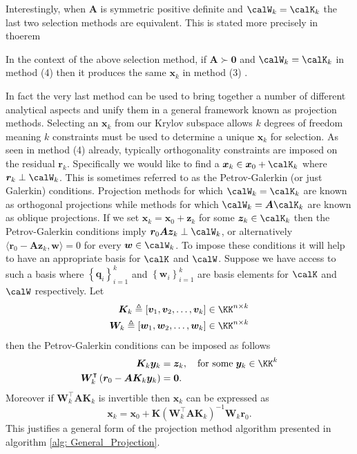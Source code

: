 Interestingly, when $\bm{A}$ is symmetric positive definite and $\calW_k = \calK_k$ the last two selection methods are equivalent. This is stated more precisely in thoerem

\begin{thm} \label{theorem: 3_4_method_eq}
    In the context of the above selection method, if $\bm{A} \succ \bm{0}$ and $\calW_k = \calK_k$ in method (4) then it produces the same $\bm{x}_k$ in method (3) \cite{DemmelJamesW1997Anla}.
\end{thm}

In fact the very last method can be used to bring together a number of different analytical aspects and unify them in a general framework known as projection methods. Selecting an $\bm{x}_k$ from our Krylov subspace allows $k$ degrees of freedom meaning $k$ constraints must be used to determine a unique $\bm{x}_k$ for selection. As seen in method (4) already, typically orthogonality constraints are imposed on the residual $\bm{r}_k$. Specifically we would like to find a $\bm{x}_k \in \bm{x}_0 + \calK_k$ where $\bm{r}_k \perp \calW_k$. This is sometimes referred to as the Petrov-Galerkin (or just Galerkin) conditions. Projection methods for which $\calW_k = \calK_k$ are known as orthogonal projections while methods for which $\calW_k = \bm{A} \calK_k$ are known as oblique projections. If we set $\bm{x}_k = \bm{x}_0 + \bm{z}_k$ for some $\bm{z}_k \in \calK_k$ then the Petrov-Galerkin conditions imply $\bm{r}_0 \bm{A} \bm{z}_k \perp \calW_k$, or alternatively $\langle \bm{r}_0 - \bm{A} \bm{z}_k , \bm{w} \rangle = 0$ for every $\bm{w} \in \calW_k$. To impose these conditions it will help to have an appropriate basis for $\calK$ and $\calW$. Suppose we have access to such a basis where $\left\{ \bm{q}_i \right\}_{i=1}^{k}$ and $\left\{ \bm{w}_i \right\}_{i=1}^{k}$ are basis elements for $\calK$ and $\calW$ respectively. Let
\begin{align*}
    \bm{K}_k \triangleq \left[ \bm{v}_1 , \bm{v}_2 , \ldots , \bm{v}_k \right] \in \KK^{n \times k} \\
    \bm{W}_k \triangleq \left[ \bm{w}_1 , \bm{w}_2 , \ldots , \bm{w}_k \right] \in \KK^{n \times k}
\end{align*}
then the Petrov-Galerkin conditions can be imposed as follows
\begin{align*}
    \bm{K}_k \bm{y}_k                                                       & = \bm{z}_k , \quad \text{for some} \; \bm{y}_k \in \KK^k \\
    \bm{W}_k^{\intercal} \left( \bm{r}_0 - \bm{A} \bm{K}_k \bm{y}_k \right) & = \bm{0}.
\end{align*}
Moreover if $\bm{W}_k^{\intercal} \bm{A} \bm{K}_k$ is invertible then $\bm{x}_k$ can be expressed as
\begin{equation} \label{eq: expr_x_Petrov_Galerkin_1}
    \bm{x}_k = \bm{x}_0 + \bm{K} \left( \bm{W}_k^{\intercal} \bm{A} \bm{K}_k \right)^{-1} \bm{W}_k \bm{r}_0.
\end{equation}
This justifies a general form of the projection method algorithm presented in algorithm \ref{alg: General_Projection}.

